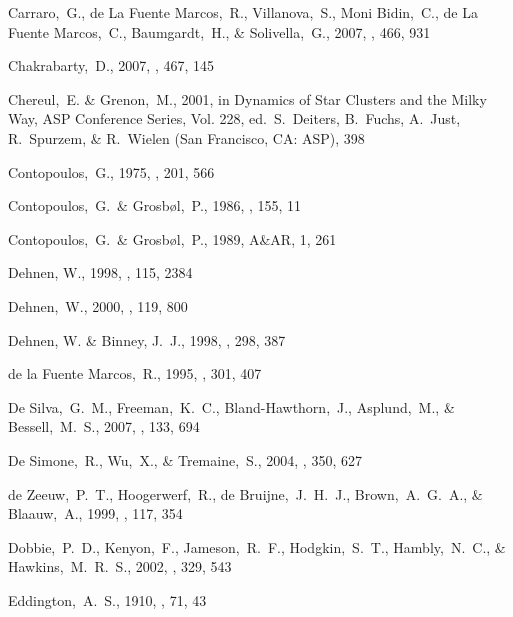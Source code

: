 \begin{thebibliography}{99}
  Carraro,~G., de La Fuente Marcos,~R., Villanova,~S., Moni Bidin,~C., de La Fuente Marcos,~C., Baumgardt,~H., \& Solivella,~G., 2007,
  \aap, 466, 931

  Chakrabarty,~D., 2007,
  \aap, 467, 145

  Chereul,~E. \& Grenon,~M., 2001, in Dynamics of Star Clusters and the
  Milky Way, ASP Conference Series, Vol. 228, ed.~S.~Deiters, B.~Fuchs,
  A.~Just, R.~Spurzem, \& R.~Wielen (San Francisco, CA: ASP), 398

  Contopoulos,~G., 1975,
  \apj, 201, 566

  Contopoulos,~G.~\& Grosb\o l,~P., 1986,
  \aap, 155, 11

  Contopoulos,~G.~\& Grosb\o l,~P., 1989,
  A\&AR, 1, 261

{Dehnen}, W., 1998, \aj, 115, 2384

  Dehnen,~W., 2000,
  \aj, 119, 800

{Dehnen}, W. \& {Binney}, J.~J., 1998, \mnras, 298, 387

  de la Fuente Marcos,~R., 1995,
  \aap, 301, 407

  De Silva,~G.~M., Freeman,~K.~C., Bland-Hawthorn,~J., Asplund,~M., \& Bessell,~M.~S., 2007,
  \aj, 133, 694

  De Simone,~R., Wu,~X., \& Tremaine,~S., 2004,
  \mnras, 350, 627

  de Zeeuw,~P.~T., Hoogerwerf,~R., de Bruijne,~J.~H.~J., Brown,~A.~G.~A., \& Blaauw,~A., 1999,
  \aj, 117, 354

  Dobbie,~P.~D., Kenyon,~F., Jameson,~R.~F., Hodgkin,~S.~T., Hambly,~N.~C., \& Hawkins,~M.~R.~S., 2002,
  \mnras, 329, 543

  Eddington,~A.~S., 1910, \mnras, 71, 43


\end{thebibliography}
